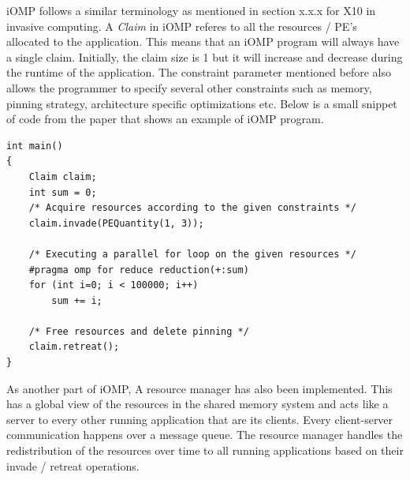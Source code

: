 iOMP follows a similar terminology as mentioned in section x.x.x for X10 in invasive computing. A \textit{Claim} in iOMP referes to all the resources / PE's allocated to the application. This means that an iOMP program will always have a single claim. Initially, the claim size is 1 but it will increase and decrease during the runtime of the application. The constraint parameter mentioned before also allows the programmer to specify several other constraints such as memory, pinning strategy, architecture specific optimizations etc. Below is a small snippet of code from the paper that shows an example of iOMP program.
\begin{lstlisting}[frame=single]
int main() 
{
	Claim claim;
	int sum = 0;
	/* Acquire resources according to the given constraints */
	claim.invade(PEQuantity(1, 3));
	
	/* Executing a parallel for loop on the given resources */
	#pragma omp for reduce reduction(+:sum)
	for (int i=0; i < 100000; i++)
		sum += i;
	
	/* Free resources and delete pinning */
	claim.retreat();
}		
\end{lstlisting}
As another part of iOMP, A resource manager has also been implemented. This has a global view of the resources in the shared memory system and acts like a server to every other running application that are its clients. Every client-server communication happens over a message queue. The resource manager handles the redistribution of the resources over time to all running applications based on their invade / retreat operations. 

